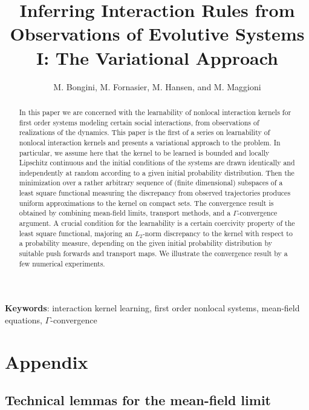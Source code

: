 \documentclass[A4paper,11pt]{article}
\title{Inferring Interaction Rules from Observations of Evolutive Systems I: The Variational Approach}
\author{M. Bongini, M. Fornasier, M. Hansen, and M. Maggioni}
\date{}
\theoremstyle{definition}
\begin{document}
\maketitle

\begin{abstract}
In this paper we are concerned with the  learnability of nonlocal interaction kernels for  first order systems modeling certain social interactions, from observations of realizations of the dynamics. This paper is the first  of a series  on learnability of nonlocal interaction kernels and presents a variational approach to the problem. In particular, we assume here that the kernel to be learned is bounded and locally Lipschitz continuous and the initial conditions of the systems are drawn identically and independently at random according to a given initial probability distribution. Then the minimization over a rather arbitrary  sequence of (finite dimensional) subspaces of a least square functional measuring the discrepancy from observed trajectories  produces uniform approximations to the kernel on compact sets. The convergence result is obtained by combining mean-field limits, transport methods, and a $\Gamma$-convergence argument. A crucial condition for the learnability is a certain coercivity property of the least square functional, majoring an $L_2$-norm discrepancy to the kernel with respect to a probability measure, depending on the given initial probability distribution by suitable push forwards and transport maps. We illustrate the convergence result by a few numerical experiments. 
\end{abstract}
{\bf Keywords}: interaction kernel learning, first order nonlocal systems, mean-field equations, $\Gamma$-convergence

\bigskip













\section{Appendix}

\subsection{Technical lemmas for the mean-field limit}\label{ap1}
\end{document}
